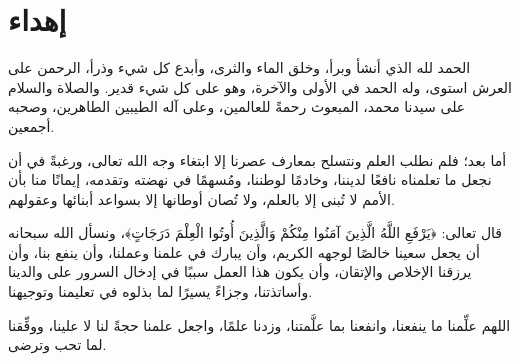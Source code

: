 \chapter*{إهداء}

الحمد لله الذي أنشأ وبرأ، وخلق الماء والثرى، وأبدع كل شيء وذرأ، الرحمن على
العرش استوى، وله الحمد في الأولى والآخرة، وهو على كل شيء قدير. والصلاة
والسلام على سيدنا محمد، المبعوث رحمةً للعالمين، وعلى آله الطيبين الطاهرين،
وصحبه أجمعين.

أما بعد؛ فلم نطلب العلم ونتسلح بمعارف عصرنا إلا ابتغاء وجه الله تعالى،
ورغبةً في أن نجعل ما تعلمناه نافعًا لديننا، وخادمًا لوطننا، ومُسهمًا في
نهضته وتقدمه، إيمانًا منا بأن الأمم لا تُبنى إلا بالعلم، ولا تُصان أوطانها
إلا بسواعد أبنائها وعقولهم.

قال تعالى: ﴿يَرْفَعِ اللَّهُ الَّذِينَ آمَنُوا مِنْكُمْ وَالَّذِينَ
أُوتُوا الْعِلْمَ دَرَجَاتٍ﴾، ونسأل الله سبحانه أن يجعل سعينا خالصًا لوجهه
الكريم، وأن يبارك في علمنا وعملنا، وأن ينفع بنا، وأن يرزقنا الإخلاص
والإتقان، وأن يكون هذا العمل سببًا في إدخال السرور على والدينا وأساتذتنا،
وجزاءً يسيرًا لما بذلوه في تعليمنا وتوجيهنا.

اللهم علِّمنا ما ينفعنا، وانفعنا بما علَّمتنا، وزدنا علمًا، واجعل علمنا
حجةً لنا لا علينا، ووفِّقنا لما تحب وترضى.

\clearpage
